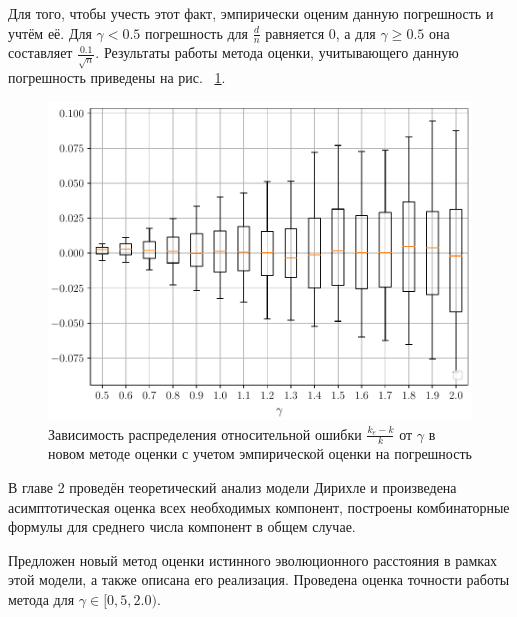 Для того, чтобы учесть этот факт, эмпирически оценим данную погрешность и учтём её.
Для $\gamma < 0.5$ погрешность для $\frac{d}{n}$ равняется $0$, а для $\gamma \geq 0.5$ она составляет $\frac{0.1}{\sqrt{n}}$.
Результаты работы метода оценки, учитывающего данную погрешность приведены на рис. ~\ref{dir_est_05_20_buffed}.
\begin{figure}[h!]
    \includegraphics[width=0.8\linewidth]{img/dir_est_05_20_buffed.pdf}
    \caption{Зависимость распределения относительной ошибки $\frac {k_e - k} k$ от $\gamma$ в новом методе оценки с учетом эмпирической оценки на погрешность}
    \label{dir_est_05_20_buffed}
\end{figure}

\chapterconclusion
В главе 2 проведён теоретический анализ модели Дирихле и произведена асимптотическая оценка всех необходимых компонент, построены комбинаторные формулы для среднего числа компонент в общем случае. 

Предложен новый метод оценки истинного эволюционного расстояния в рамках этой модели, а также описана его реализация. Проведена оценка точности работы метода для $\gamma \in [0,5, 2.0)$.